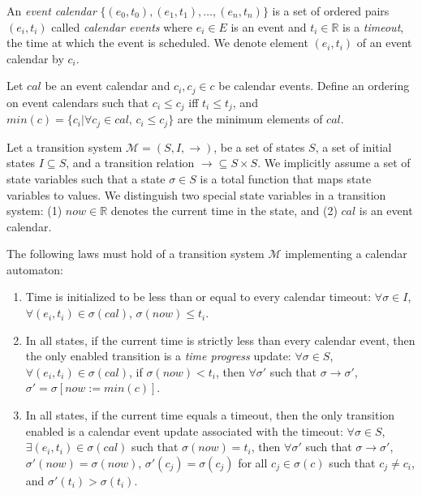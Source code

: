 \documentclass{llncs/llncs}
\begin{document}
An \emph{event calendar} $\{ (e_0, t_0), (e_1, t_1), \ldots, (e_n, t_n) \}$ is a set of ordered pairs $(e_i, t_i)$ called \emph{calendar events} where $e_i \in E$ is an event and $t_i \in \mathbb{R}$ is a \emph{timeout}, the time at which the event is scheduled. We denote element $(e_i, t_i)$ of an event calendar by $c_i$.

Let $cal$ be an event calendar and $c_i, c_j \in c$ be calendar events. Define an ordering on event calendars such that $c_i \leq c_j$ iff $t_i \leq t_j$, and $min(c) = \{ c_i | \forall c_j \in cal, \, c_i \leq c_j  \}$ are the minimum elements of $cal$.

Let a transition system $\mathcal{M} = (S, I, \rightarrow)$, be a set of states $S$, a set of initial states $I \subseteq S$, and a transition relation $\rightarrow \subseteq S \times S$. We implicitly assume a set of state variables such that a state $\sigma \in S$ is a total function that maps state variables to values. We distinguish two special state variables in a transition system: (1) $now \in \mathbb{R}$ denotes the current time in the state, and (2) $cal$ is an event calendar.

The following laws must hold of a transition system $\mathcal{M}$ implementing a calendar automaton:

\begin{enumerate}
\item \label{cal:a} Time is initialized to be less than or equal to every calendar timeout: $\forall \sigma \in I$, $\forall (e_i, t_i) \in \sigma(cal)$, $\sigma(now) \leq t_i$.


\item \label{cal:c} In all states, if the current time is strictly less than every calendar event, then the only enabled transition is a \emph{time progress} update: $\forall \sigma \in S$, $\forall (e_i, t_i) \in \sigma(cal)$, if $\sigma(now) < t_i$, then $\forall \sigma'$ such that $\sigma \rightarrow \sigma'$, $\sigma' = \sigma[now := min(c)]$.

\item \label{cal:d} In all states, if the current time equals a timeout, then the only transition enabled is a calendar event update associated with the timeout: $\forall \sigma \in S$, $\exists (e_i, t_i) \in \sigma(cal)$ such that $\sigma(now) = t_i$, then $\forall \sigma'$ such that $\sigma \rightarrow \sigma'$, $\sigma'(now) = \sigma(now)$, $\sigma'(c_j) = \sigma(c_j)$ for all $c_j \in \sigma(c)$ such that $c_j \neq c_i$, and $\sigma'(t_i) > \sigma(t_i)$.
\end{enumerate}
\end{document}
